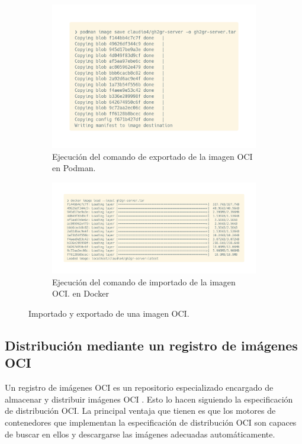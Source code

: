 \begin{figure}
    \begin{subfigure}{0.49\textwidth}
        \includegraphics[width=\linewidth]{images/export-server-image.png}
        \caption{Ejecución del comando de exportado de la imagen OCI en Podman.} \label{fig:export-oci-image}
    \end{subfigure}
    \hspace*{\fill}   %
    \begin{subfigure}{0.49\textwidth}
        \includegraphics[width=\linewidth]{images/import-server-image.png}
        \caption{Ejecución del comando de importado de la imagen OCI. en Docker} \label{fig:import-oci-image}
    \end{subfigure}
    \caption{Importado y exportado de una imagen OCI.}
\end{figure}


\subsection{Distribución mediante un registro de imágenes OCI}
Un registro de imágenes OCI es un repositorio especializado encargado de almacenar y distribuir imágenes OCI \cite{ociDistribution}. Esto lo hacen siguiendo la especificación de distribución OCI. La principal ventaja que tienen es que los motores de contenedores que implementan la especificación de distribución OCI son capaces de buscar en ellos y descargarse las imágenes adecuadas automáticamente.

